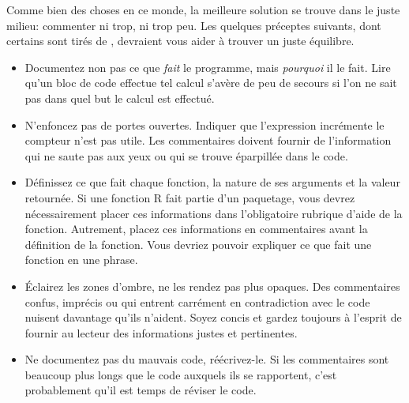 Comme bien des choses en ce monde, la meilleure solution se trouve
dans le juste milieu: commenter ni trop, ni trop peu. Les quelques
préceptes suivants, dont certains sont tirés de
\citet{Kernighan:practice:1999}, devraient vous aider à trouver un
juste équilibre.

\begin{itemize}
\item Documentez non pas ce que \emph{fait} le programme, mais
  \emph{pourquoi} il le fait. Lire qu'un bloc de code effectue tel
  calcul s'avère de peu de secours si l'on ne sait pas dans quel but
  le calcul est effectué.
\item N'enfoncez pas de portes ouvertes. Indiquer que l'expression
   incrémente le compteur  n'est pas utile.
  Les commentaires doivent fournir de l'information qui ne saute pas
  aux yeux ou qui se trouve éparpillée dans le code.
\item Définissez ce que fait chaque fonction, la nature de ses
  arguments et la valeur retournée. Si une fonction R fait partie d'un
  paquetage, vous devrez nécessairement placer ces informations dans
  l'obligatoire rubrique d'aide de la fonction. Autrement, placez ces
  informations en commentaires avant la définition de la fonction.
  Vous devriez pouvoir expliquer ce que fait une fonction en une
  phrase.
\item Éclairez les zones d'ombre, ne les rendez pas plus opaques. Des
  commentaires confus, imprécis ou qui entrent carrément en
  contradiction avec le code nuisent davantage qu'ils n'aident. Soyez
  concis et gardez toujours à l'esprit de fournir au lecteur des
  informations justes et pertinentes.
\item Ne documentez pas du mauvais code, réécrivez-le. Si les
  commentaires sont beaucoup plus longs que le code auxquels ils se
  rapportent, c'est probablement qu'il est temps de réviser le code.
\end{itemize}

